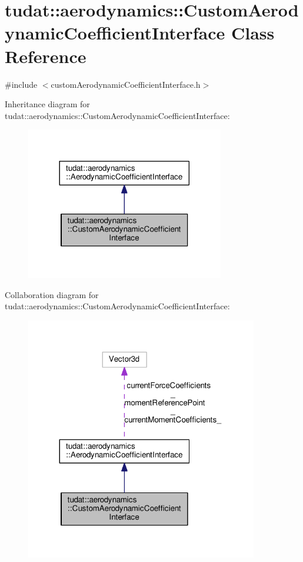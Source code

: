 \hypertarget{classtudat_1_1aerodynamics_1_1CustomAerodynamicCoefficientInterface}{}\section{tudat\+:\+:aerodynamics\+:\+:Custom\+Aerodynamic\+Coefficient\+Interface Class Reference}
\label{classtudat_1_1aerodynamics_1_1CustomAerodynamicCoefficientInterface}


{\ttfamily \#include $<$custom\+Aerodynamic\+Coefficient\+Interface.\+h$>$}



Inheritance diagram for tudat\+:\+:aerodynamics\+:\+:Custom\+Aerodynamic\+Coefficient\+Interface\+:
\nopagebreak
\begin{figure}[H]
\begin{center}
\leavevmode
\includegraphics[width=245pt]{classtudat_1_1aerodynamics_1_1CustomAerodynamicCoefficientInterface__inherit__graph}
\end{center}
\end{figure}


Collaboration diagram for tudat\+:\+:aerodynamics\+:\+:Custom\+Aerodynamic\+Coefficient\+Interface\+:
\nopagebreak
\begin{figure}[H]
\begin{center}
\leavevmode
\includegraphics[width=287pt]{classtudat_1_1aerodynamics_1_1CustomAerodynamicCoefficientInterface__coll__graph}
\end{center}
\end{figure}
